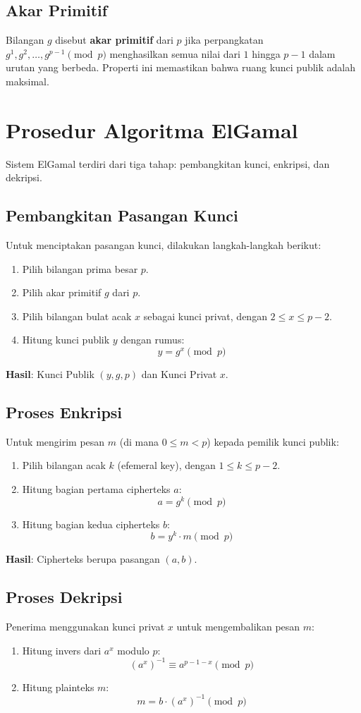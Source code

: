 \documentclass[../main.tex]{subfiles}
\begin{document}
\subsection{Akar Primitif}
Bilangan $g$ disebut \textbf{akar primitif} dari $p$ jika perpangkatan $g^1, g^2, \dots, g^{p-1} \pmod{p}$ menghasilkan semua nilai dari $1$ hingga $p-1$ dalam urutan yang berbeda. Properti ini memastikan bahwa ruang kunci publik adalah maksimal.

\section{Prosedur Algoritma ElGamal}
Sistem ElGamal terdiri dari tiga tahap: pembangkitan kunci, enkripsi, dan dekripsi.

\subsection{Pembangkitan Pasangan Kunci}
Untuk menciptakan pasangan kunci, dilakukan langkah-langkah berikut:
\begin{enumerate}
    \item Pilih bilangan prima besar $p$.
    \item Pilih akar primitif $g$ dari $p$.
    \item Pilih bilangan bulat acak $x$ sebagai kunci privat, dengan $2 \le x \le p-2$.
    \item Hitung kunci publik $y$ dengan rumus:
    \[ y = g^x \pmod{p} \]
\end{enumerate}
\textbf{Hasil}: Kunci Publik $(y, g, p)$ dan Kunci Privat $x$.

\subsection{Proses Enkripsi}
Untuk mengirim pesan $m$ (di mana $0 \le m < p$) kepada pemilik kunci publik:
\begin{enumerate}
    \item Pilih bilangan acak $k$ (efemeral key), dengan $1 \le k \le p-2$.
    \item Hitung bagian pertama cipherteks $a$:
    \[ a = g^k \pmod{p} \]
    \item Hitung bagian kedua cipherteks $b$:
    \[ b = y^k \cdot m \pmod{p} \]
\end{enumerate}
\textbf{Hasil}: Cipherteks berupa pasangan $(a, b)$.

\subsection{Proses Dekripsi}
Penerima menggunakan kunci privat $x$ untuk mengembalikan pesan $m$:
\begin{enumerate}
    \item Hitung invers dari $a^x$ modulo $p$:
    \[ (a^x)^{-1} \equiv a^{p-1-x} \pmod{p} \]
    \item Hitung plainteks $m$:
    \[ m = b \cdot (a^x)^{-1} \pmod{p} \]
\end{enumerate}
\end{document}
